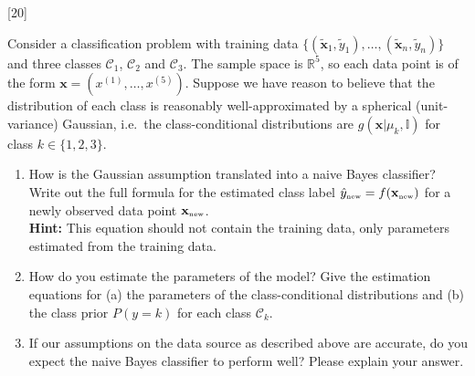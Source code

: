 \documentclass[]{../util/ColumbiaAssm}
\begin{document}
  \vspace{-2cm}


\AddSubmissionRules

  

  \vspace{0.5cm}

  \def\Rd{\mathbb{R}^d}
  \def\indH{\mbox{\tiny H}}
  \def\v{\mathbf{v}}
  \def\sign{\mbox{sgn}}
  \def\sp#1{\left< #1\right>}
  \def\train{\tilde{\x}}
  \def\trainlabel{\tilde{y}}
  \def\x{\mathbf{x}}
  \def\y{\mathbf{y}}
  \def\z{\mathbf{z}}


\begin{questions}

[20]

    Consider a classification problem with training data $\lbrace
    (\train_1,\trainlabel_1),\ldots,(\train_n,\trainlabel_n)\rbrace$
    and three classes $\mathcal{C}_1$, $\mathcal{C}_2$ and
    $\mathcal{C}_3$. The sample space is $\mathbb{R}^5$, so each
    data point is of the form $\x=(x^{(1)},\ldots,x^{(5)})$.
    Suppose we have reason to believe that the
    distribution of each
    class is reasonably well-approximated by a spherical
    (unit-variance) Gaussian, i.e.\ the class-conditional distributions
    are $g(\x|\mu_k,\mathbb{I})$ for class ${k\in\lbrace 1,2,3\rbrace}$.

    \begin{enumerate}
    \item How is the Gaussian assumption translated into a naive Bayes classifier?
      Write out the full formula for the estimated
      class label $\hat{y}_{\mbox{\tiny new}}=f(\x_{\mbox{\tiny new}})$ for a newly observed
      data point $\x_{\mbox{\tiny new}}$.\\
      \textbf{Hint:} This equation should not contain the training
      data, only parameters estimated from the training data.
    \item How do you estimate the parameters of the model? Give the
      estimation equations for (a) the parameters of the
      class-conditional distributions
      and (b) the class prior $P(y=k)$ for each class $\mathcal{C}_k$.
    \item If our assumptions on the data source as described above are accurate,
      do you expect the naive Bayes classifier to perform well? Please explain your answer.
    \end{enumerate}


\end{questions}
\end{document}
